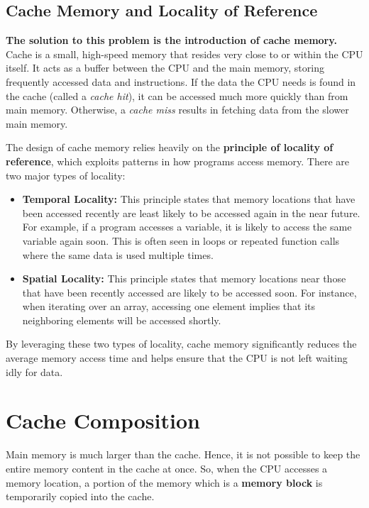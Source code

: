 \documentclass[12pt]{book}
\begin{document}
\subsection{Cache Memory and Locality of Reference}
\textbf{The solution to this problem is the introduction of cache memory.} Cache is a small, high-speed memory that resides very close to or within the CPU itself. It acts as a buffer between the CPU and the main memory, storing frequently accessed data and instructions. If the data the CPU needs is found in the cache (called a \textit{cache hit}), it can be accessed much more quickly than from main memory. Otherwise, a \textit{cache miss} results in fetching data from the slower main memory.

The design of cache memory relies heavily on the \textbf{principle of locality of reference}, which exploits patterns in how programs access memory. There are two major types of locality:

\begin{itemize}
    \item \textbf{Temporal Locality:} This principle states that memory locations that have been accessed recently are least likely to be accessed again in the near future. For example, if a program accesses a variable, it is likely to access the same variable again soon. This is often seen in loops or repeated function calls where the same data is used multiple times.
    
    \item \textbf{Spatial Locality:} This principle states that memory locations near those that have been recently accessed are likely to be accessed soon. For instance, when iterating over an array, accessing one element implies that its neighboring elements will be accessed shortly.
\end{itemize}

By leveraging these two types of locality, cache memory significantly reduces the average memory access time and helps ensure that the CPU is not left waiting idly for data.


\section{Cache Composition}

Main memory is much larger than the cache. Hence, it is not possible to keep the entire memory content in the cache at once. So, when the CPU accesses a memory location, a portion of the memory which is a \textbf{memory block} is temporarily copied into the cache.
\end{document}
